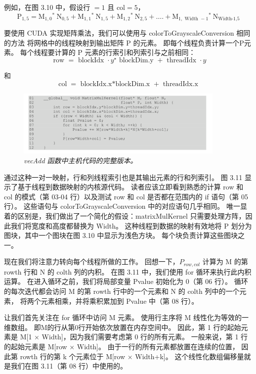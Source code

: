 例如，在图 3.10 中，假设行 $=1$ 且 $\mathrm{col}=5$，
$$
\mathrm{P}_{1,5}=\mathrm{M}_{1,0}{ }^{*} \mathrm{~N}_{0,5}+\mathrm{M}_{1,1}{ }^{*} \mathrm{~N}_{1,5}+\mathrm{M}_{1,2}{ }^{*} \mathrm{~N}_{2,5}+\ldots .+\mathrm{M}_{1, \text { Width }-1}{ }^{*} \mathrm{~N}_{\text {Width-1,5}}
$$

要使用 CUDA 实现矩阵乘法，我们可以使用与 colorToGrayscaleConversion 相同的方法
将网格中的线程映射到输出矩阵 P 的元素。 即每个线程负责计算一个P元素。 
每个线程要计算的 P 元素的行索引和列索引与之前相同：
$$
\text { row }=\text { blockIdx } \cdot y^{\star} \text { blockDim.y }+ \text { threadIdx } \cdot y
$$

和
$$
\operatorname{col}=\text { blockIdx.x*blockDim.x }+ \text { threadIdx.x }
$$

\begin{figure}[H]
	\centering
	\includegraphics[width=0.9\textwidth]{figs/F3.11.png}
	\caption{\textit{\color{red} vecAdd 函数中主机代码的完整版本。}}
\end{figure}

通过这种一对一映射，行和列线程索引也是其输出元素的行和列索引。 图 3.11 显示了基于线程到数据映射的内核源代码。 
读者应该立即看到熟悉的计算 row 和 col 的模式（第 03-04 行）以及测试 row 和 col 是否都在范围内的 if 语句（第 05 行）。 
这些语句与 colorToGrayscaleConversion 中的对应语句几乎相同。 
唯一显着的区别是，我们做出了一个简化的假设：matrixMulKernel 只需要处理方阵，因此我们将宽度和高度都替换为 Width。 
这种线程到数据的映射有效地将 P 划分为图块，其中一个图块在图 3.10 中显示为浅色方块。 每个块负责计算这些图块之一。

现在我们将注意力转向每个线程所做的工作。 回想一下，$P_{row,col}$ 计算为 M 的第 rowth 行和 N 的 colth 列的内积。
在图 3.11 中，我们使用 for 循环来执行此内积运算。 在进入循环之前，我们将局部变量 Pvalue 初始化为 0（第 06 行）。 
循环的每次迭代都会访问 M 的第 rowth 行中的一个元素和 N 的 colth 列中的一个元素，
将两个元素相乘，并将乘积累加到 Pvalue 中（第 08 行）。

让我们首先关注在 for 循环中访问 M 元素。 使用行主序将 M 线性化为等效的一维数组。 
即M的行从第0行开始依次放置在内存空间中。 因此，第 1 行的起始元素是 M[1 × Width]，因为我们需要考虑第 0 行的所有元素。
一般来说，第 1 行的起始元素是 M[row × Width]。 由于一行的所有元素都放置在连续的位置，
因此第 rowth 行的第 k 个元素位于 M[row × Width+k]。 这个线性化数组偏移量就是我们在图 3.11（第 08 行）中使用的。

